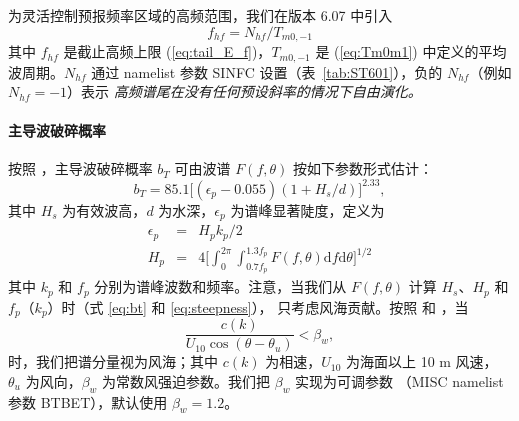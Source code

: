 为灵活控制预报频率区域的高频范围，我们在版本 6.07 中引入
\begin{equation}
f_{hf} = N_{hf}/T_{m0, -1}
\end{equation}
其中 $f_{hf}$ 是截止高频上限 (\ref{eq:tail_E_f})，$T_{m0,-1}$ 是
(\ref{eq:Tm0m1}) 中定义的平均波周期。$N_{hf}$ 通过 namelist 参数 SINFC
设置（表~\ref{tab:ST601}），负的 $N_{hf}$（例如 $N_{hf} = -1$）表示
\emph{高频谱尾在没有任何预设斜率的情况下自由演化。}

\noindent
\paragraph{主导波破碎概率}
按照 \citet[][their Fig.~12]{art:BBY01}，主导波破碎概率 $b_T$ 可由波谱
$F(f, \theta)$ 按如下参数形式估计：
\begin{equation}
b_T = 85.1 \Big[ (\epsilon_p - 0.055) (1 + H_s / d) \Big]^{2.33},
\label{eq:bt}
\end{equation}
其中 $H_s$ 为有效波高，$d$ 为水深，$\epsilon_p$ 为谱峰显著陡度，定义为
\begin{equation}
\begin{array}{rcl}
\epsilon_p &=& H_p k_p / 2\\
H_p &=& 4 \Big[\int_{0}^{2\pi} \int_{0.7f_p}^{1.3f_p} F(f, \theta) \mathrm{d}f \mathrm{d}\theta \Big]^{1/2}
\label{eq:steepness}
\end{array}
\end{equation}
其中 $k_p$ 和 $f_p$ 分别为谱峰波数和频率。注意，当我们从 $F(f,\theta)$ 计算
$H_s$、$H_p$ 和 $f_p$（$k_p$）时（式 \ref{eq:bt} 和 \ref{eq:steepness}），
只考虑风海贡献。按照 \citet{Janssen1989} 和 \citet{Bidlot2001}，当
\begin{equation}
\frac{c(k)}{U_{10} \cos (\theta - \theta_u)}  < \beta_w,
\label{eq:beta}
\end{equation}
时，我们把谱分量视为风海；其中 $c(k)$ 为相速，$U_{10}$ 为海面以上 10 m 风速，
$\theta_u$ 为风向，$\beta_w$ 为常数风强迫参数。我们把 $\beta_w$ 实现为可调参数
（{\F MISC} namelist 参数 {\code BTBET}），默认使用 $\beta_w=1.2$。

\noindent
